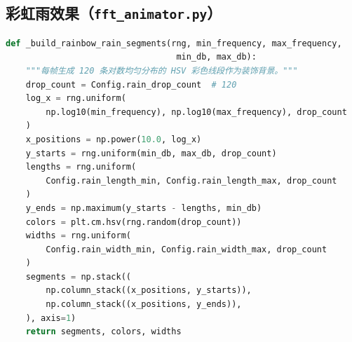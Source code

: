 \documentclass[12pt,a4paper,UTF8]{ctexart}
\begin{document}
\subsection{彩虹雨效果（\texttt{fft\_animator.py}）}

\begin{lstlisting}[language=Python]
def _build_rainbow_rain_segments(rng, min_frequency, max_frequency,
                                  min_db, max_db):
    """每帧生成 120 条对数均匀分布的 HSV 彩色线段作为装饰背景。"""
    drop_count = Config.rain_drop_count  # 120
    log_x = rng.uniform(
        np.log10(min_frequency), np.log10(max_frequency), drop_count
    )
    x_positions = np.power(10.0, log_x)
    y_starts = rng.uniform(min_db, max_db, drop_count)
    lengths = rng.uniform(
        Config.rain_length_min, Config.rain_length_max, drop_count
    )
    y_ends = np.maximum(y_starts - lengths, min_db)
    colors = plt.cm.hsv(rng.random(drop_count))
    widths = rng.uniform(
        Config.rain_width_min, Config.rain_width_max, drop_count
    )
    segments = np.stack((
        np.column_stack((x_positions, y_starts)),
        np.column_stack((x_positions, y_ends)),
    ), axis=1)
    return segments, colors, widths
\end{lstlisting}
\end{document}
